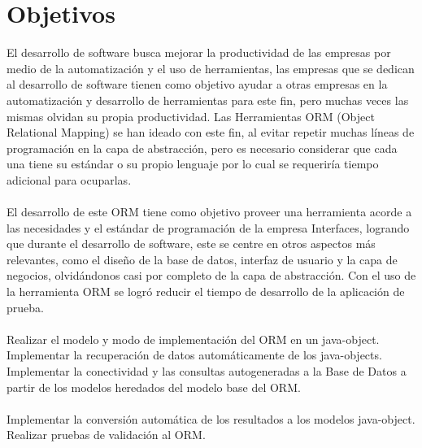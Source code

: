 \section{Objetivos} 
\begin{flushright}
\begin{itemize}
El desarrollo de software busca mejorar la productividad de las empresas por medio de la automatización y el uso de herramientas, las empresas que se dedican al desarrollo de software tienen como objetivo ayudar a otras empresas en la automatización y desarrollo de herramientas para este fin, pero muchas veces las mismas olvidan su propia productividad. Las Herramientas ORM (Object  Relational  Mapping) se han ideado con este fin, al evitar repetir muchas líneas de programación en la capa de abstracción, pero es necesario considerar que cada una tiene su estándar o su propio lenguaje por lo cual se requeriría tiempo adicional para ocuparlas.  \textbf{}\\
\textbf{}\\
El desarrollo de este ORM tiene como objetivo proveer una herramienta acorde a las necesidades y el estándar de programación de la empresa Interfaces, logrando  que durante el desarrollo de software, este se centre en otros aspectos más relevantes, como el diseño de la base de datos, interfaz de usuario y la capa de negocios, olvidándonos casi por completo de la capa de abstracción. Con el uso de la herramienta ORM se logró reducir el tiempo de desarrollo de la aplicación de prueba. \textbf{}\\
\textbf{}\\
Realizar el modelo y modo de implementación del ORM en un java-object. \textbf{}\\
Implementar la recuperación de datos automáticamente de los java-objects. \textbf{}\\
Implementar la conectividad y las consultas autogeneradas a la Base de Datos a partir de los modelos heredados del modelo base del ORM. \textbf{}\\
\textbf{}\\
Implementar la conversión automática de los resultados a los modelos java-object. \textbf{}\\
Realizar pruebas de validación al ORM. \textbf{}\\



\end{itemize} 


\end{flushright}